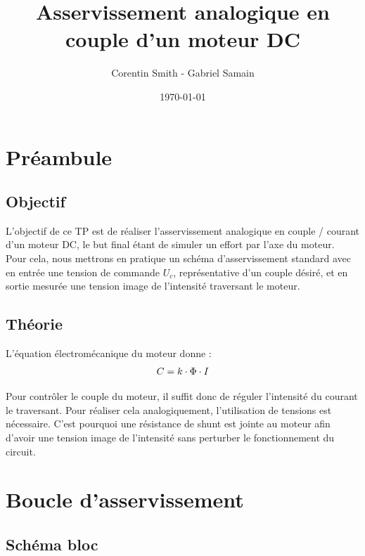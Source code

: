 \documentclass[a4paper]{article}
\title{Asservissement analogique en couple d'un moteur DC}
\author{Corentin Smith - Gabriel Samain}
\date{\today}
\begin{document}
\maketitle

\newpage
\tableofcontents
\newpage

\section{Préambule}

\subsection{Objectif}

L'objectif de ce TP est de réaliser l'asservissement analogique en couple / courant d'un moteur DC, le but final étant de simuler un effort par l'axe du moteur. \\
Pour cela, nous mettrons en pratique un schéma d'asservissement standard avec en entrée une tension de commande $U_{c}$, représentative d'un couple désiré, et en sortie mesurée une tension image de l'intensité traversant le moteur.

\subsection{Théorie}

L'équation électromécanique du moteur donne :
$$
C = k \cdot \Phi \cdot I \\
$$

Pour contrôler le couple du moteur, il suffit donc de réguler l'intensité du courant le traversant. Pour réaliser cela analogiquement, l'utilisation de tensions est nécessaire. C'est pourquoi une résistance de shunt est jointe au moteur afin d'avoir une tension image de l'intensité sans perturber le fonctionnement du circuit.

\section{Boucle d'asservissement}

\subsection{Schéma bloc}

\hfill \\
\begin{center}
\end{center}
\end{document}
